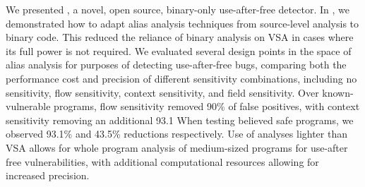 We presented \aliasname, a novel, open source, binary-only use-after-free detector.
In \aliasname, we demonstrated how to adapt alias analysis techniques from source-level analysis to binary code.
This reduced the reliance of binary analysis on VSA in cases where its full power is not required.
We evaluated several design points in the space of alias analysis for purposes of detecting use-after-free bugs, comparing both the performance cost and precision of different sensitivity combinations, including no sensitivity, flow sensitivity, context sensitivity, and field sensitivity.
Over known-vulnerable programs, flow sensitivity removed 90\% of false positives, with context sensitivity removing an additional 93.1%
When testing believed safe programs, we observed 93.1\% and 43.5\% reductions respectively.
Use of analyses lighter than VSA allows for whole program analysis of medium-sized programs for use-after free vulnerabilities, with additional computational resources allowing for increased precision.
